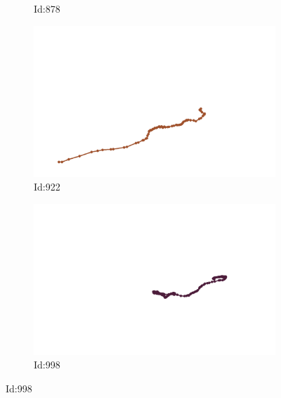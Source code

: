 \documentclass[12pt,twoside]{report}
\begin{document}
\begin{figure}
\begin{subfigure}[b]{0.20\textwidth}
\caption{Id:878}
\end{subfigure}
\begin{subfigure}[b]{0.20\textwidth}
\centering
\includegraphics[width=\textwidth]{../trajectories/922.png}
\caption{Id:922}
\end{subfigure}
\begin{subfigure}[b]{0.20\textwidth}
\centering
\includegraphics[width=\textwidth]{../trajectories/998.png}
\caption{Id:998}
\end{subfigure}
\end{figure}
\end{document}
